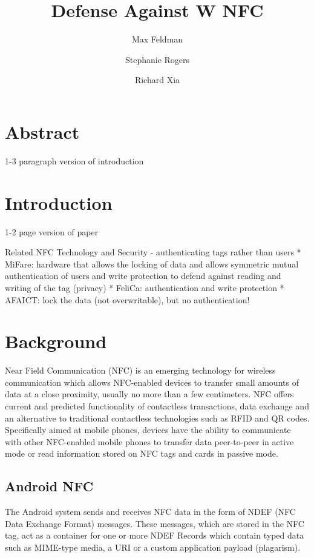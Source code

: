 \documentclass[12pt]{article}
\begin{document}
\title{Defense Against W NFC}
\author{Max Feldman \and Stephanie Rogers \and Richard Xia}
\maketitle

\section{Abstract}
1-3 paragraph version of introduction

\section{Introduction}
1-2 page version of paper



Related NFC Technology and Security - authenticating tags rather than users
* MiFare: hardware that allows the locking of data and allows symmetric mutual authentication of users and write protection to defend against reading and writing of the tag (privacy)
* FeliCa: authentication and write protection 
* AFAICT: lock the data (not overwritable), but no authentication!

\section{Background}
Near Field Communication (NFC) is an emerging technology for wireless communication which allows NFC-enabled devices to transfer small amounts of data at a close proximity, usually no more than a few centimeters. NFC offers current and predicted functionality of contactless transactions, data exchange and an alternative to traditional contactless technologies such as RFID and QR codes. Specifically aimed at mobile phones, devices have the ability to communicate with other NFC-enabled mobile phones to transfer data peer-to-peer in active mode or read information stored on NFC tags and cards in passive mode. 

\subsection{Android NFC}

The Android system sends and receives NFC data in the form of NDEF (NFC Data Exchange Format) messages. These messages, which are stored in the NFC tag, act as a container for one or more NDEF Records which contain typed data such as MIME-type media, a URI or a custom application payload (plagarism).  
\end{document}

